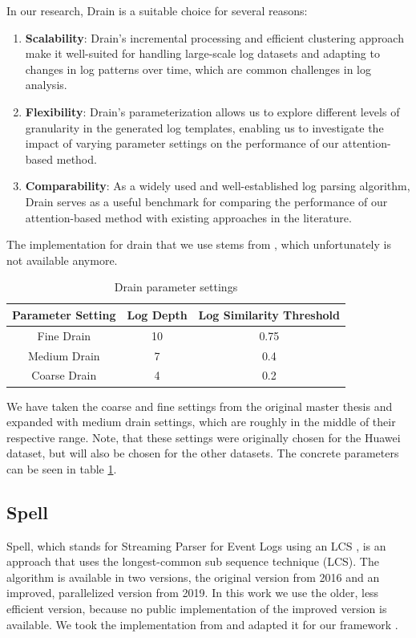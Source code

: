 In our research, Drain is a suitable choice for several reasons:
\begin{enumerate}
    \item \textbf{Scalability}: Drain's incremental processing and efficient clustering approach make it well-suited for handling large-scale log datasets and adapting to changes in log patterns over time, which are common challenges in log analysis.
    \item \textbf{Flexibility}: Drain's parameterization allows us to explore different levels of granularity in the generated log templates, enabling us to investigate the impact of varying parameter settings on the performance of our attention-based method.
    \item \textbf{Comparability}: As a widely used and well-established log parsing algorithm, Drain serves as a useful benchmark for comparing the performance of our attention-based method with existing approaches in the literature.
\end{enumerate}


The implementation for drain that we use stems from \cite{drainrepo}, which unfortunately is not available anymore. 

\begin{table}[h]
\centering
\begin{tabular}{|c|c|c|}
\hline
\textbf{Parameter Setting} & \textbf{Log Depth} & \textbf{Log Similarity Threshold} \\ \hline
Fine Drain   & 10 & 0.75 \\ \hline
Medium Drain & 7  & 0.4  \\ \hline
Coarse Drain & 4  & 0.2  \\ \hline
\end{tabular}
\caption{Drain parameter settings}
\label{table:drain_parameters}
\end{table}

We have taken the coarse and fine settings from the original master thesis \cite{witterauf2021domainml} and expanded with medium drain settings, which are roughly in the middle of their respective range. Note, that these settings were originally chosen for the Huawei dataset, but will also be chosen for the other datasets.  The concrete parameters can be seen in table \ref{table:drain_parameters}. 

\subsection{Spell}
\label{sec:Methods:Algorithms:Spell}
Spell, which stands for Streaming Parser for Event Logs using an LCS \cite{spell}, is an approach that uses the longest-common sub sequence technique (LCS). The algorithm is available in two versions, the original version from 2016 and an improved, parallelized version from 2019. In this work we use the older, less efficient version, because no public implementation of the improved version is available. We took the implementation from \cite{zhu2019tools} and adapted it for our framework \cite{witterauf2021domainml}.\\

